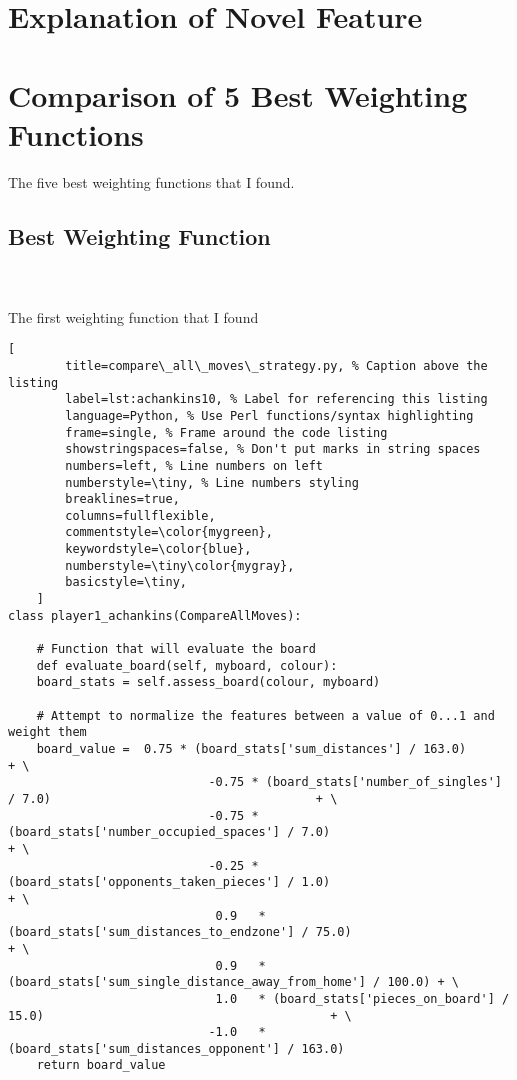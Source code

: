 \documentclass[
	12pt, %
]{fphw}
\begin{document}

\section*{Explanation of Novel Feature}


\section*{Comparison of 5 Best Weighting Functions}

The five best weighting functions that I found.

\subsection*{Best Weighting Function}

\hfill\\ \\  The first weighting function that I found

\begin{lstlisting}[
		title=compare\_all\_moves\_strategy.py, % Caption above the listing
		label=lst:achankins10, % Label for referencing this listing
		language=Python, % Use Perl functions/syntax highlighting
		frame=single, % Frame around the code listing
		showstringspaces=false, % Don't put marks in string spaces
		numbers=left, % Line numbers on left
		numberstyle=\tiny, % Line numbers styling
		breaklines=true,
		columns=fullflexible,
		commentstyle=\color{mygreen},
		keywordstyle=\color{blue},
		numberstyle=\tiny\color{mygray},
		basicstyle=\tiny,
	]
class player1_achankins(CompareAllMoves):

    # Function that will evaluate the board
    def evaluate_board(self, myboard, colour):
    board_stats = self.assess_board(colour, myboard)

    # Attempt to normalize the features between a value of 0...1 and weight them
    board_value =  0.75 * (board_stats['sum_distances'] / 163.0)                                        + \
                            -0.75 * (board_stats['number_of_singles'] / 7.0)                                     + \
                            -0.75 * (board_stats['number_occupied_spaces'] / 7.0)                          + \
                            -0.25 * (board_stats['opponents_taken_pieces'] / 1.0)                            + \
                             0.9   * (board_stats['sum_distances_to_endzone'] / 75.0)                      + \
                             0.9   * (board_stats['sum_single_distance_away_from_home'] / 100.0) + \
                             1.0   * (board_stats['pieces_on_board'] / 15.0)                                        + \
                            -1.0   * (board_stats['sum_distances_opponent'] / 163.0)
    return board_value

\end{lstlisting}
\end{document}
